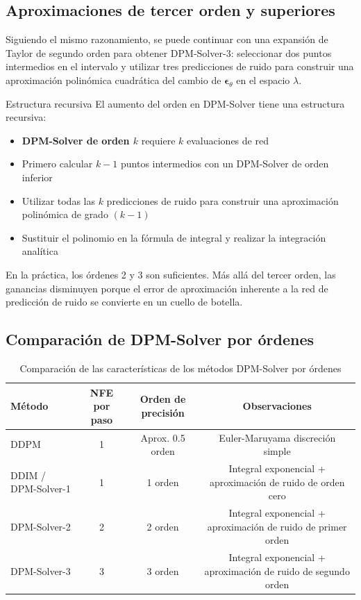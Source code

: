 \subsection{Aproximaciones de tercer orden y superiores}

Siguiendo el mismo razonamiento, se puede continuar con una expansión de Taylor de segundo orden para obtener DPM-Solver-3: seleccionar dos puntos intermedios en el intervalo y utilizar tres predicciones de ruido para construir una aproximación polinómica cuadrática del cambio de $\boldsymbol{\epsilon}_\theta$ en el espacio $\lambda$.

\begin{knowledgebox}{Estructura recursiva}
El aumento del orden en DPM-Solver tiene una estructura recursiva:
\begin{itemize}
    \item \textbf{DPM-Solver de orden $k$} requiere $k$ evaluaciones de red
    \item Primero calcular $k-1$ puntos intermedios con un DPM-Solver de orden inferior
    \item Utilizar todas las $k$ predicciones de ruido para construir una aproximación polinómica de grado $(k-1)$
    \item Sustituir el polinomio en la fórmula de integral y realizar la integración analítica
\end{itemize}
En la práctica, los órdenes 2 y 3 son suficientes. Más allá del tercer orden, las ganancias disminuyen porque el error de aproximación inherente a la red de predicción de ruido se convierte en un cuello de botella.
\end{knowledgebox}

\subsection{Comparación de DPM-Solver por órdenes}

\begin{table}[H]
\centering
\begin{tabular}{lccc}
\toprule
\textbf{Método} & \textbf{NFE por paso} & \textbf{Orden de precisión} & \textbf{Observaciones} \\
\midrule
DDPM & 1 & Aprox. 0.5 orden & Euler-Maruyama discreción simple \\
DDIM / DPM-Solver-1 & 1 & 1 orden & Integral exponencial + aproximación de ruido de orden cero \\
DPM-Solver-2 & 2 & 2 orden & Integral exponencial + aproximación de ruido de primer orden \\
DPM-Solver-3 & 3 & 3 orden & Integral exponencial + aproximación de ruido de segundo orden \\
\bottomrule
\end{tabular}
\caption{Comparación de las características de los métodos DPM-Solver por órdenes}
\end{table}

